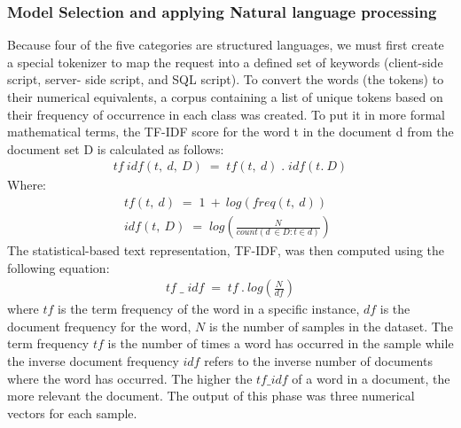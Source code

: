\subsubsection{Model Selection and applying Natural language processing}
\label{NLP}
Because four of the five categories are structured languages, we must first create a special tokenizer to map the request into a defined set of keywords (client-side script, server- side script, and SQL script).
To convert the words (the tokens) to their numerical equivalents, a corpus containing a list of unique tokens based on their frequency of occurrence in each class was created. To put it in more formal mathematical terms, the TF-IDF score for the word t in the document d from the document set D is calculated as follows:
\begin{align}
    tf\:idf(t,\: d,\: D)\; =\; tf (t,\: d) \; . \; idf (t.\: D)
\end{align}
Where: 
\begin{align}
    tf(t,\: d)\; =\; 1 \: + \: log(freq(t,\: d)) \: \: \\
    idf(t, \:D)\; = \; log(\frac{N}{count (d \: \in D :t \in d)})\:  \:
\end{align}
The statistical-based text representation, TF-IDF, was then computed using the following equation: 
\begin{align}
    tf\; \_ \; idf \;=\; tf\:.\:log(\frac{N}{df})
\end{align}
 where $tf$ is the term frequency of the word in a specific instance, $df$ is the document frequency for the word, $N$ is the number of samples in the dataset. The term frequency $tf$ is the number of times a word has occurred in the sample while the inverse document frequency $idf$ refers to the inverse number of documents where the word has occurred. The higher the $tf \_ idf$ of a word in a document, the more relevant the document. The output of this phase was three numerical vectors for each sample.
